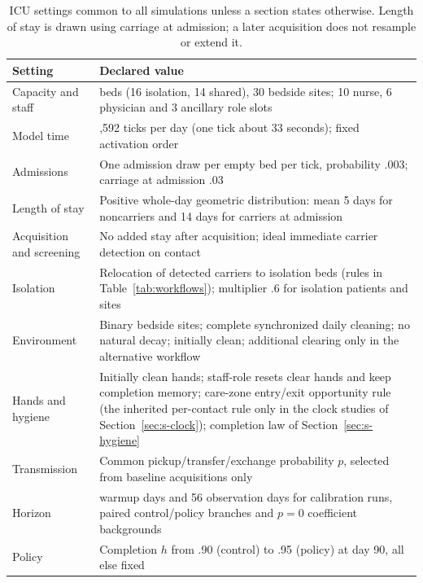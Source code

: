 \documentclass[11pt]{article}
\begin{document}
\begin{table}[htbp]\centering\small
\caption{ICU settings common to all simulations unless a section states otherwise. Length of stay is drawn using carriage at admission; a later acquisition does not resample or extend it.}\label{tab:params}
\begin{tabular}{>{\raggedright\arraybackslash}p{.29\linewidth}>{\raggedright\arraybackslash}p{.63\linewidth}}\toprule
Setting & Declared value\\\midrule
Capacity and staff & 30 beds (16 isolation, 14 shared), 30 bedside sites; 10 nurse, 6 physician and 3 ancillary role slots\\
Model time & 2,592 ticks per day (one tick about 33 seconds); fixed activation order\\
Admissions & One admission draw per empty bed per tick, probability .003; carriage at admission .03\\
Length of stay & Positive whole-day geometric distribution: mean 5 days for noncarriers and 14 days for carriers at admission\\
Acquisition and screening & No added stay after acquisition; ideal immediate carrier detection on contact\\
Isolation & Relocation of detected carriers to isolation beds (rules in Table~\ref{tab:workflows}); multiplier .6 for isolation patients and sites\\
Environment & Binary bedside sites; complete synchronized daily cleaning; no natural decay; initially clean; additional clearing only in the alternative workflow\\
Hands and hygiene & Initially clean hands; staff-role resets clear hands and keep completion memory; care-zone entry/exit opportunity rule (the inherited per-contact rule only in the clock studies of Section~\ref{sec:s-clock}); completion law of Section~\ref{sec:s-hygiene}\\
Transmission & Common pickup/transfer/exchange probability $p$, selected from baseline acquisitions only\\
Horizon & 90 warmup days and 56 observation days for calibration runs, paired control/policy branches and $p=0$ coefficient backgrounds\\
Policy & Completion $h$ from .90 (control) to .95 (policy) at day 90, all else fixed\\
\bottomrule\end{tabular}
\end{table}
\end{document}
